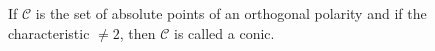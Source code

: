 If $\mathcal{C}$ is the set of absolute points of an orthogonal polarity and if the characteristic $\neq 2$, then $\mathcal{C}$ is called a conic.

